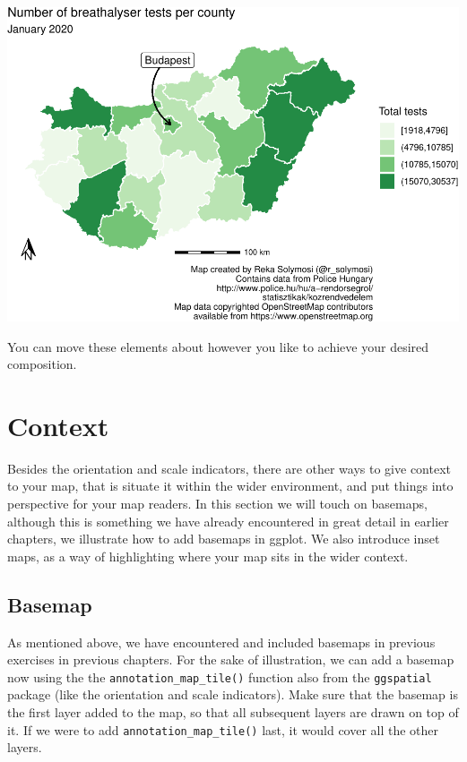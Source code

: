 \documentclass[
]{book}
\begin{document}
\includegraphics{crime_mapping_files/figure-latex/scale-1.pdf}

You can move these elements about however you like to achieve your desired composition.

\hypertarget{context}{%
\section{Context}\label{context}}

Besides the orientation and scale indicators, there are other ways to give context to your map, that is situate it within the wider environment, and put things into perspective for your map readers. In this section we will touch on basemaps, although this is something we have already encountered in great detail in earlier chapters, we illustrate how to add basemaps in ggplot. We also introduce inset maps, as a way of highlighting where your map sits in the wider context.

\hypertarget{basemap}{%
\subsection{Basemap}\label{basemap}}

As mentioned above, we have encountered and included basemaps in previous exercises in previous chapters. For the sake of illustration, we can add a basemap now using the the \texttt{annotation\_map\_tile()} function also from the \texttt{ggspatial} package (like the orientation and scale indicators). Make sure that the basemap is the first layer added to the map, so that all subsequent layers are drawn on top of it. If we were to add \texttt{annotation\_map\_tile()} last, it would cover all the other layers.
\end{document}
